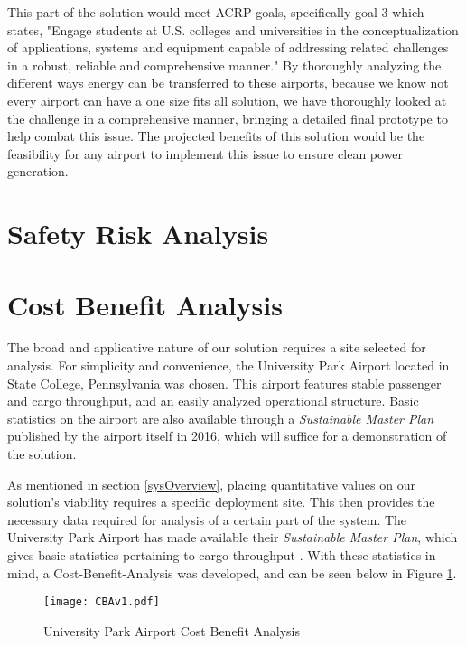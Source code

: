 \documentclass[../main.tex]{subfiles}
\begin{document}
This part of the solution would meet ACRP goals, specifically goal 3 which states, "Engage students at U.S. colleges and universities in the conceptualization of applications, systems and equipment capable of addressing related challenges in a robust, reliable and comprehensive manner." By thoroughly analyzing the different ways energy can be transferred to these airports, because we know not every airport can have a one size fits all solution, we have thoroughly looked at the challenge in a comprehensive manner, bringing a detailed final prototype to help combat this issue. 
The projected benefits of this solution would be the feasibility for any airport to implement this issue to ensure clean power generation. 

\section{Safety Risk Analysis} %

\section{Cost Benefit Analysis} %

The broad and applicative nature of our solution requires a site selected for analysis. For simplicity and convenience, the University Park Airport located in State College, Pennsylvania was chosen. This airport features stable passenger and cargo throughput, and an easily analyzed operational structure. Basic statistics on the airport are also available through a \emph{Sustainable Master Plan} published by the airport itself \cite{SCEplan} in 2016, which will suffice for a demonstration of the solution.\par


As mentioned in section \ref{sysOverview}, placing quantitative values on our solution's viability requires a specific deployment site. This then provides the necessary data required for analysis of a certain part of the system. The University Park Airport has made available their \emph{Sustainable Master Plan}, which gives basic statistics pertaining to cargo throughput \cite{SCEplan}. With these statistics in mind, a Cost-Benefit-Analysis was developed, and can be seen below in Figure \ref{fig:CBA}.


\begin{figure}
\centering
\texttt{[image: CBAv1.pdf]}
\caption{University Park Airport Cost Benefit Analysis}
\label{fig:CBA}
\end{figure}
\FloatBarrier
\end{document}
